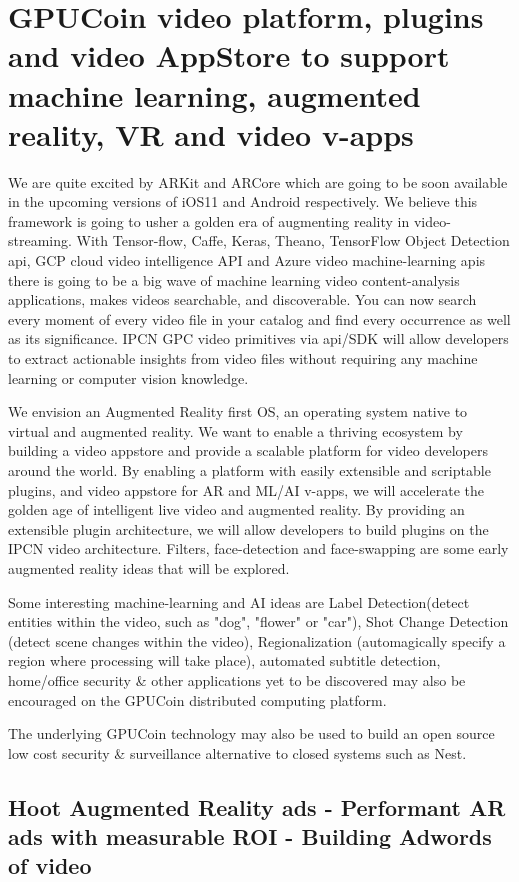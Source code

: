 \documentclass{article}
\begin{document}
\section{GPUCoin video platform, plugins and video AppStore to support machine learning, augmented reality, VR and video v-apps}
We are quite excited by ARKit and ARCore which are going to be soon available in the upcoming versions of iOS11 and Android respectively. We believe this framework is going to usher a golden era of augmenting reality in video-streaming. With Tensor-flow, Caffe, Keras, Theano, TensorFlow Object Detection api, GCP cloud video intelligence API and Azure video machine-learning apis there is going to be a big wave of machine learning video content-analysis applications, makes videos searchable, and discoverable. You can now search every moment of every video file in your catalog and find every occurrence as well as its significance. IPCN GPC video primitives via api/SDK will allow developers to extract actionable insights from video files without requiring any machine learning or computer vision knowledge. 

We envision an Augmented Reality first OS, an operating system native to virtual and augmented reality. We want to enable a thriving ecosystem by building a video appstore and provide a scalable platform for video developers around the world. By enabling a platform with easily extensible and scriptable plugins, and video appstore for AR and ML/AI v-apps, we will accelerate the golden age of intelligent live video and augmented reality. By providing an extensible plugin architecture, we will allow developers to build plugins on the IPCN video architecture. Filters, face-detection and face-swapping are some early augmented reality ideas that will be explored.

Some interesting machine-learning and AI ideas are Label Detection(detect entities within the video, such as "dog", "flower" or "car"), Shot Change Detection (detect scene changes within the video), Regionalization (automagically specify a region where processing will take place), automated subtitle detection, home/office security \& other applications yet to be discovered may also be encouraged on the GPUCoin distributed computing platform.


The underlying GPUCoin technology may also be used to build an open source low cost security \& surveillance alternative to closed systems such as Nest.
\iffalse %
\subsection{Hoot Augmented Reality ads - Performant AR ads with measurable ROI - Building Adwords of video }
\end{document}
